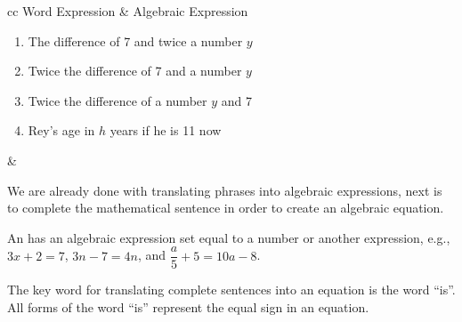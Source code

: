 \yourown{}

\begin{center}
\begin{tabularu}{cc}
\hline \hline
Word Expression & Algebraic Expression\\
\hline
\parbox[t][]{0.5\linewidth}{
\begin{enumerate}
\item The difference of 7 and twice a number $y$
\item Twice the difference of 7 and a number $y$
\item Twice the difference of a number $y$ and 7
\item Rey's age in $h$ years if he is 11 now
\end{enumerate}
}
 & \\
\hline
\end{tabularu}
\end{center}
We are already done with translating phrases into algebraic expressions, next is to complete the
mathematical sentence in order to create an algebraic equation.
\begin{definition}
An  has an algebraic expression set equal to a number or another expression, e.g., $3x+2=7$, $3n-7=4n$, and $\dfrac{a}{5}+5=10a-8$.
\end{definition}
The key word for translating complete sentences into an equation is the word “is”. All forms of the
word “is” represent the equal sign in an equation.

